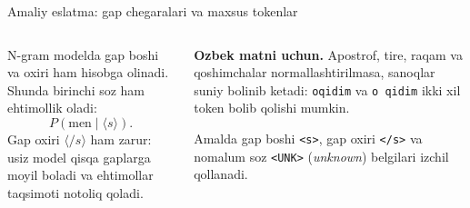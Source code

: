 \documentclass[aspectratio=169,11pt]{beamer}
\newcommand{\uzq}{\textquotesingle{}}
\begin{document}
\begin{frame}{Amaliy eslatma: gap chegaralari va maxsus tokenlar}
\footnotesize

\begin{columns}[T,totalwidth=\textwidth]
\begin{column}{0.55\textwidth}
N-gram modelda gap boshi va oxiri ham hisobga olinadi. Shunda birinchi
so\uzq{}z ham ehtimollik oladi:
\[
P(\text{men}\mid \langle s\rangle).
\]
Gap oxiri $\langle /s\rangle$ ham zarur: usiz model qisqa gaplarga moyil
bo\uzq{}ladi va ehtimollar taqsimoti noto\uzq{}liq qoladi.

\vspace{6pt}
\centering
{}
\end{column}

\begin{column}{0.45\textwidth}
\begin{tcolorbox}[okbox,left=2mm,right=2mm,top=1mm,bottom=1mm]
\scriptsize
\textbf{O\uzq{}zbek matni uchun.} Apostrof, tire, raqam va qo\uzq{}shimchalar
normallashtirilmasa, sanoqlar sun\uzq{}iy bo\uzq{}linib ketadi:
\texttt{o\uzq{}qidim} va \texttt{o qidim} ikki xil token bo\uzq{}lib qolishi mumkin.
\end{tcolorbox}

\vspace{4pt}
Amalda gap boshi \texttt{<s>}, gap oxiri \texttt{</s>} va noma\uzq{}lum
so\uzq{}z \texttt{<UNK>} (\textit{unknown}) belgilari izchil qo\uzq{}llanadi.
\end{column}
\end{columns}

\end{frame}
\end{document}
